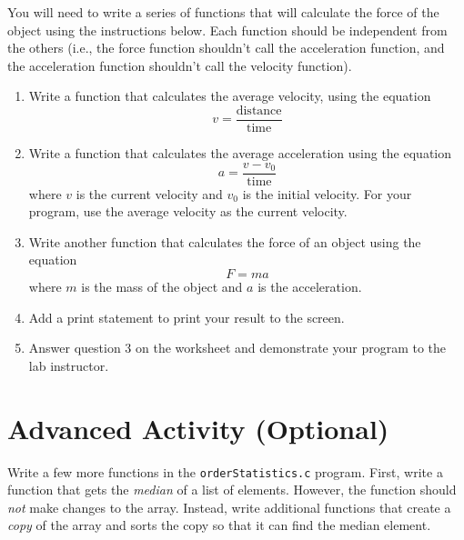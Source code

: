 \documentclass[12pt]{scrartcl}
\begin{document}
You will need to write a series of functions that will calculate the force of the 
object using the instructions below.  Each function should be independent 
from the others (i.e., the force function shouldn't call the acceleration function, 
and the acceleration function shouldn't call the velocity function).  

\begin{enumerate}
  \item Write a function that calculates the average velocity, using the equation 
	$$v = \frac{\textrm{distance}}{\textrm{time}}$$
  \item Write a function that calculates the average acceleration using the equation
	$$a = \frac{v - v_0}{\textrm{time}}$$
  	where $v$ is the current velocity and $v_0$ is the initial velocity.  For your 
	program, use the average velocity as the current velocity.
  \item Write another function that calculates the force of an object using the equation
	$$F = ma$$
	where $m$ is the mass of the object and $a$ is the acceleration.  
  \item Add a print statement to print your result to the screen.
  \item Answer question 3 on the worksheet and demonstrate your program to 
  	the lab instructor.
\end{enumerate}
	
\section{Advanced Activity (Optional)}

Write a few more functions in the \texttt{orderStatistics.c} program.  First,
write a function that gets the \emph{median} of a list of elements.  However, the
function should \emph{not} make changes to the array.  Instead, write additional
functions that create a \emph{copy} of the array and sorts the copy so that it can
find the median element.  
\end{document}
